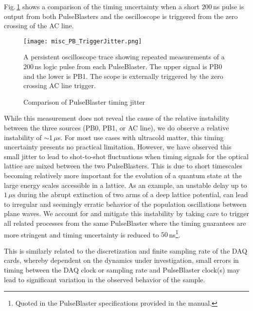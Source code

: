 Fig.\,\ref{fig:pbTimingJitter} shows a comparison of the timing uncertainty when a short $200$\,ns pulse is output from both PulseBlasters and the oscilloscope is triggered from the zero crossing of the AC line.
	\begin{figure}
		\centerline{
		\texttt{[image: misc\_PB\_TriggerJitter.png]}}
		\caption{Comparison of PulseBlaster timing jitter}{A persistent oscilloscope trace showing repeated measurements of a $200$\,ns logic pulse from each PulseBlaster. The upper signal is PB0 and the lower is PB1. The scope is externally triggered by the zero crossing AC line trigger.}
		\label{fig:pbTimingJitter}
	\end{figure} 
While this measurement does not reveal the cause of the relative instability between the three sources (PB0, PB1, or AC line), we do observe a relative instability of $\sim$1\,$\mu$s.
For most use cases with ultracold matter, this timing uncertainty presents no practical limitation.
However, we have observed this small jitter to lead to shot-to-shot fluctuations when timing signals for the optical lattice are mixed between the two PulseBlasters.
This is due to short timescales becoming relatively more important for the evolution of a quantum state at the large energy scales accessible in a lattice.
As an example, an unstable delay up to $1\,\mu \text{s}$ during the abrupt extinction of two arms of a deep lattice potential, can lead to irregular and seemingly erratic behavior of the population oscillations between plane waves.
We account for and mitigate this instability by taking care to trigger all related processes from the same PulseBlaster where the timing guarantees are more stringent and timing uncertainty is reduced to $50$\,ns\footnote{Quoted in the PulseBlaster specifications provided in the manual.}.

This is similarly related to the discretization and finite sampling rate of the DAQ cards, whereby dependent on the dynamics under investigation, small errors in timing between the DAQ clock or sampling rate and PulseBlaster clock(s) may lead to significant variation in the observed behavior of the sample.



